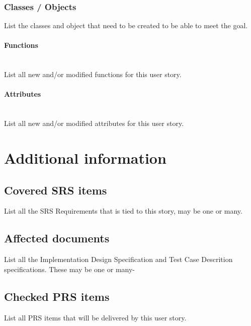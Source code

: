 \documentclass[a4paper]{article}
\begin{document}
	\subsubsection{Classes / Objects}
	List the classes and object that need to be created to be able to meet the goal.
	 
	\paragraph{Functions}\mbox{} \\
    List all new and/or modified functions for this user story.
    
	\paragraph{Attributes}\mbox{} \\
	List all new and/or modified attributes for this user story.

	
\section{Additional information}

	\subsection{Covered SRS items}
    List all the SRS Requirements that is tied to this story, may be one or many.
	
	\subsection{Affected documents}
    List all the Implementation Design Specification and Test Case Descrition specifications.
    These may be one or many-
	
	\subsection{Checked PRS items}
	List all PRS items that will be delivered by this user story.
\end{document}
